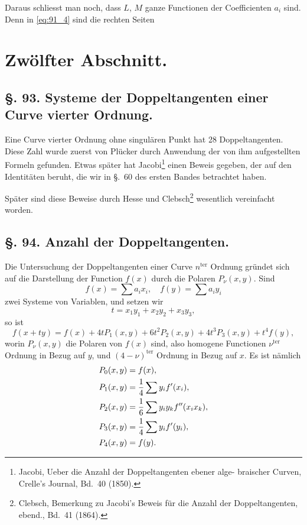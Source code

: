 \documentclass[12pt,a4paper]{article}
\theoremstyle{plain}
\theoremstyle{definition}
\theoremstyle{remark}
\begin{document}
Daraus schliesst man noch, dass $L$, $M$ ganze Functionen
der Coefficienten $a_i$ sind. Denn in \eqref{eq:91_4} sind die rechten Seiten

\newpage
\section*{Zwölfter Abschnitt.}

\subsection*{§. 93. Systeme der Doppeltangenten einer Curve vierter Ordnung.}

Eine Curve vierter Ordnung ohne singulären Punkt hat 28
Doppeltangenten. Diese Zahl wurde zuerst von Plücker durch
Anwendung der von ihm aufgestellten Formeln gefunden. Etwas
später hat Jacobi\footnote{Jacobi, \glqq{}Ueber die Anzahl der Doppeltangenten ebener alge-
braischer Curven\grqq{}, Crelle's Journal, Bd.~40 (1850).} einen Beweis gegeben, der auf den Identitäten
beruht, die wir in \S.~60 des ersten Bandes betrachtet haben.

Später sind diese Beweise durch Hesse und Clebsch\footnote{Clebsch, \glqq{}Bemerkung zu Jacobi's Beweis für die Anzahl der Doppeltangenten\grqq{}, ebend., Bd.~41 (1864).} wesentlich vereinfacht worden.

\subsection*{§. 94. Anzahl der Doppeltangenten.}

Die Untersuchung der Doppeltangenten einer Curve $n^{\text{ter}}$
Ordnung gründet sich auf die Darstellung der Function $f(x)$
durch die Polaren $P_\nu(x, y)$. Sind
\begin{equation*}
f(x) = \sum a_i x_i, \quad f(y) = \sum a_i y_i
\end{equation*}
zwei Systeme von Variablen, und setzen wir
\begin{equation}\label{eq:94_1}
t = x_1 y_1 + x_2 y_2 + x_3 y_3,
\end{equation}
so ist
\begin{equation}\label{eq:94_2}
f(x + ty) = f(x) + 4t P_1(x, y) + 6t^2 P_2(x, y) + 4t^3 P_3(x, y) + t^4 f(y),
\end{equation}
worin $P_\nu(x, y)$ die Polaren von $f(x)$ sind, also homogene
Functionen $\nu^{\text{ter}}$ Ordnung in Bezug auf $y$, und $(4-\nu)^{\text{ter}}$ Ordnung
in Bezug auf $x$. Es ist nämlich
\begin{align}
P_0(x, y) &= f(x), \notag \\
P_1(x, y) &= \frac{1}{4}\sum y_i f'(x_i), \label{eq:94_3} \\
P_2(x, y) &= \frac{1}{6}\sum y_i y_k f''(x_i x_k), \notag \\
P_3(x, y) &= \frac{1}{4}\sum y_i f'(y_i), \notag \\
P_4(x, y) &= f(y). \notag
\end{align}
\end{document}
